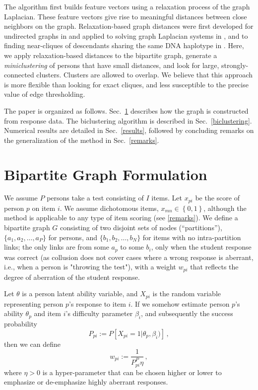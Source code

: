 \documentclass{article}
\begin{document}
The algorithm first builds feature vectors using a relaxation process of the graph Laplacian. These feature vectors give rise to meaningful distances between close neighbors on the graph. Relaxation-based graph distances were first developed for undirected graphs in \cite{safro} and applied to solving graph Laplacian systems in \cite{lamg}, and to finding near-cliques of descendants sharing the same DNA haplotype in \cite{primal}. Here, we apply relaxation-based distances to the bipartite graph, generate a {\it miniclustering} of persons that have small distances, and look for large, strongly-connected clusters. Clusters are allowed to overlap. We believe that this approach is more flexible than looking for exact cliques, and less susceptible to the precise value of edge thresholding.

The paper is organized as follows. Sec.~\ref{model} describes how the graph is constructed from response data. The biclustering algorithm is described in Sec.~\ref{biclustering}. Numerical results are detailed in Sec.~\ref{results}, followed by concluding remarks on the generalization of the method in Sec.~\ref{remarks}.

\section{Bipartite Graph Formulation}
\label{model}
We assume $P$ persons take a test consisting of $I$ items. Let $x_{pi}$ be the score of person $p$ on item $i$. We assume dichotomous items, $x_{mn} \in \left\{0,1\right\}$, although the method is applicable to any type of item scoring (see \ref{remarks}). We define a bipartite graph $G$ consisting of two disjoint sets of nodes (``partitions''), $\{a_1,a_2,\ldots,a_P\}$ for persons, and $\{b_1,b_2,\ldots,b_N\}$ for items with no intra-partition links; the only links are from some $a_p$ to some $b_i$, only when the student response was correct (as collusion does not cover cases where a wrong response is aberrant, i.e., when a person is "throwing the test"), with a weight $w_{pi}$ that reflects the degree of aberration of the student response.

Let $\theta$ is a person latent ability variable, and $X_{pi}$ is the random variable representing person $p$'s response to item $i$. If we somehow estimate person $p$'s ability $\theta_p$ and item $i$'s difficulty parameter $\beta_i$, and subsequently the success probability
\begin{equation}
	P_{pi} := P[X_{pi}=1 | \theta_p, \beta_i)]\,,
	\label{ppi} 
\end{equation}
then we can define
\begin{equation}
  w_{pi} := \frac{1}{P_{pi}^P{\eta}}\,,
  \label{weight}
\end{equation}
where $\eta > 0$ is a hyper-parameter that can be chosen higher or lower to emphasize or de-emphasize highly aberrant responses.
\end{document}
